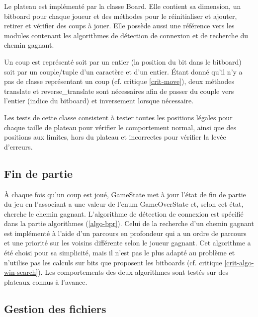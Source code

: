 \documentclass[12pt]{article}
\begin{document}
Le plateau est implémenté par la classe Board. Elle contient sa dimension, un bitboard pour chaque joueur et des méthodes pour le réinitialiser et ajouter, retirer et vérifier des coups à jouer. Elle possède aussi une référence vers les modules contenant les algorithmes de détection de connexion et de recherche du chemin gagnant. 

\bigskip
Un coup est représenté soit par un entier (la position du bit dans le bitboard) soit par un couple/tuple d’un caractère et d’un entier. Étant donné qu’il n’y a pas de classe représentant un coup (cf. critique \ref{crit-move}), deux méthodes translate et reverse\_translate sont nécessaires afin de passer du couple vers l’entier (indice du bitboard) et inversement lorsque nécessaire.

\bigskip
Les tests de cette classe consistent à tester toutes les positions légales pour chaque taille de plateau pour vérifier le comportement normal, ainsi que des positions aux limites, hors du plateau et incorrectes pour vérifier la levée d’erreurs.

\subsection{Fin de partie}

À chaque fois qu'un coup est joué, GameState met à jour l'état de fin de partie du jeu en l'associant a une valeur de l'enum GameOverState et, selon cet état, cherche le chemin gagnant. L’algorithme de détection de connexion est spécifié dans la partie algorithmes (\ref{algo-bpr}). Celui de la recherche d’un chemin gagnant est implémenté à l’aide d’un parcours en profondeur qui a un ordre de parcours et une priorité sur les voisins différente selon le joueur gagnant. Cet algorithme a été choisi pour sa simplicité, mais il n’est pas le plus adapté au problème et n’utilise pas les calculs sur bits que proposent les bitboards (cf. critique \ref{crit-algo-win-search}). Les comportements des deux algorithmes sont testés sur des plateaux connus à l’avance.

\subsection{Gestion des fichiers} \label{impl-fichier}
\end{document}
